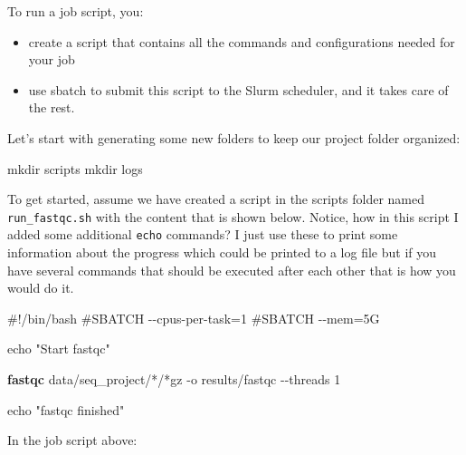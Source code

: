 \documentclass[
  letterpaper,
  DIV=11,
  numbers=noendperiod]{scrreprt}
\newenvironment{Shaded}{}{}
\newcommand{\AttributeTok}[1]{\textcolor[rgb]{0.84,0.23,0.29}{#1}}
\newcommand{\BuiltInTok}[1]{\textcolor[rgb]{0.84,0.23,0.29}{#1}}
\newcommand{\CommentTok}[1]{\textcolor[rgb]{0.42,0.45,0.49}{#1}}
\newcommand{\ExtensionTok}[1]{\textcolor[rgb]{0.84,0.23,0.29}{\textbf{#1}}}
\newcommand{\FunctionTok}[1]{\textcolor[rgb]{0.44,0.26,0.76}{#1}}
\newcommand{\NormalTok}[1]{\textcolor[rgb]{0.14,0.16,0.18}{#1}}
\newcommand{\PreprocessorTok}[1]{\textcolor[rgb]{0.84,0.23,0.29}{#1}}
\newcommand{\StringTok}[1]{\textcolor[rgb]{0.01,0.18,0.38}{#1}}
\providecommand{\tightlist}{%
  \setlength{\itemsep}{0pt}\setlength{\parskip}{0pt}}\usepackage{longtable,booktabs,array}
\begin{document}
To run a job script, you:

\begin{itemize}
\tightlist
\item
  create a script that contains all the commands and configurations
  needed for your job
\item
  use sbatch to submit this script to the Slurm scheduler, and it takes
  care of the rest.
\end{itemize}

Let's start with generating some new folders to keep our project folder
organized:

\begin{Shaded}
\begin{Highlighting}[]
\FunctionTok{mkdir}\NormalTok{ scripts }
\FunctionTok{mkdir}\NormalTok{ logs}
\end{Highlighting}
\end{Shaded}

To get started, assume we have created a script in the scripts folder
named \texttt{run\_fastqc.sh} with the content that is shown below.
Notice, how in this script I added some additional \texttt{echo}
commands? I just use these to print some information about the progress
which could be printed to a log file but if you have several commands
that should be executed after each other that is how you would do it.

\begin{Shaded}
\begin{Highlighting}[]
\CommentTok{\#!/bin/bash}
\CommentTok{\#SBATCH {-}{-}cpus{-}per{-}task=1}
\CommentTok{\#SBATCH {-}{-}mem=5G}

\BuiltInTok{echo} \StringTok{"Start fastqc"}

\ExtensionTok{fastqc}\NormalTok{ data/seq\_project/}\PreprocessorTok{*}\NormalTok{/}\PreprocessorTok{*}\NormalTok{gz }\AttributeTok{{-}o}\NormalTok{ results/fastqc  }\AttributeTok{{-}{-}threads}\NormalTok{ 1}

\BuiltInTok{echo} \StringTok{"fastqc finished"}
\end{Highlighting}
\end{Shaded}

In the job script above:
\end{document}
